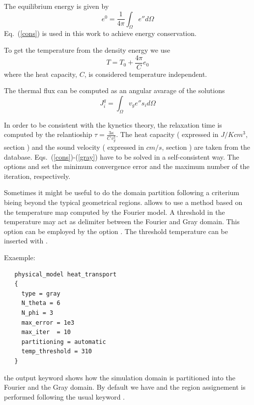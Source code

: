 The equilibrium energy is given by
\begin{equation}\label{cons}
  e^0 = \frac{1}{4 \pi} \int_{\Omega} e'' d\Omega
\end{equation}
Eq.~(\ref{cons}) is used in this work to achieve energy conservation.

To get the temperature from the density energy we use
\begin{equation}\label{capacity}
  T = T_0 + \frac{4 \pi}{C}e_0
\end{equation}
where the heat capacity, $C$, is considered temperature independent.

The thermal flux can be computed as an angular avarage of the solutions
\begin{equation}\label{flux}
  J^q_i =  \int_{\Omega} v_g e'' s_i d\Omega
\end{equation}

In order to be consistent with the kynetics theory, the relaxation time is computed by the relantioship $\tau = \frac{3 \kappa}{C \,v_g^2}$. The heat capacity ( expressed in $J/K cm^3$, section ) and the sound velocity  ( expressed in $cm/s$, section ) are taken from the database.
Eqs.~(\ref{cons})-(\ref{gray}) have to be solved in a self-consistent way. The options  and  set the minimum convergence error and the maximum number of the iteration, respectively.

Sometimes it might be useful to do the domain partition following a criterium bieing beyond the typical geometrical regions.  allows to use a method based on the temperature map computed by the Fourier model. A  threshold in the temperature may act as delimiter between the Fourier and Gray domain. This option can be employed by the option . The threshold temperature can be inserted with .

Exaemple:
\begin{verbatim}
   physical_model heat_transport
   {		
     type = gray
     N_theta = 6
     N_phi = 3
     max_error = 1e3
     max_iter  = 10
     partitioning = automatic
     temp_threshold = 310
   }
\end{verbatim}
the output keyword  shows how the simulation domain is partitioned into the Fourier and the Gray domain.
 By default we have   and the region assignement is performed following the usual keyword .

